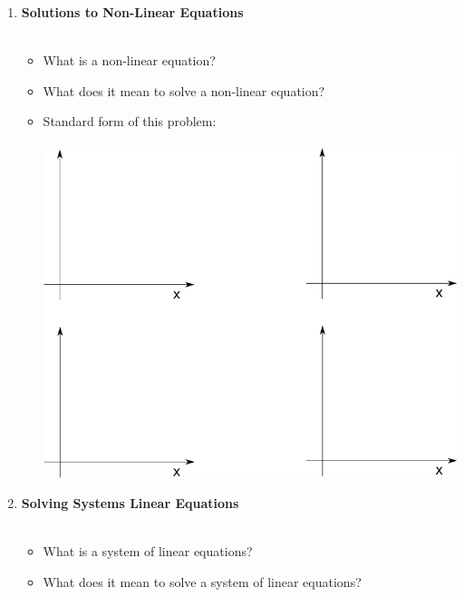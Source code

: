\documentclass[11pt]{article}
\begin{document}
	\begin{enumerate}	
		
		\item \textbf{  Solutions to Non-Linear Equations}\\\\ 
			\begin{itemize}
					\item What is a non-linear equation? \vspace{20mm} \\
					\item What does it mean to solve a non-linear equation? \vspace{20mm} \\
					\item Standard form of this problem:\\\\
					\includegraphics[scale=.5]{lecture1_fig1.png}
			\end{itemize}
\newpage			
			\item \textbf{  Solving Systems Linear Equations}\\\\ 
			\begin{itemize}
					\item What is a system of linear equations?\vspace{20mm} \\
					\item What does it mean to solve a  system of linear equations? \vspace{20mm} \\

\end{itemize}
\end{enumerate}
\end{document}
